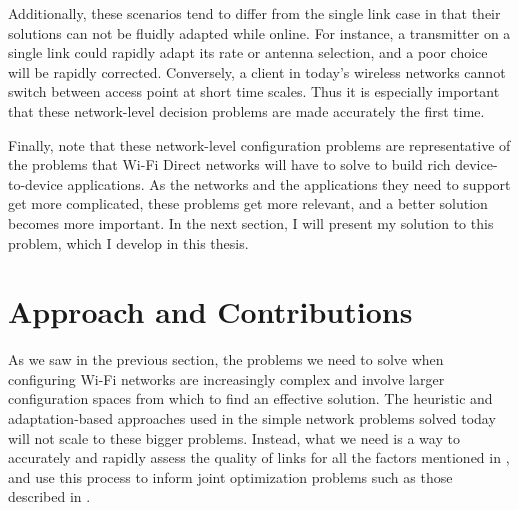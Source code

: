 Additionally, these scenarios tend to differ from the single link case in that their solutions can not be fluidly adapted while online. For instance, a transmitter on a single link could rapidly adapt its rate or antenna selection, and a poor choice will be rapidly corrected. Conversely, a client in today's wireless networks cannot switch between access point at short time scales. Thus it is especially important that these network-level decision problems are made accurately the first time.

Finally, note that these network-level configuration problems are representative of the problems that Wi-Fi Direct networks will have to solve to build rich device-to-device applications. As the networks and the applications they need to support get more complicated, these problems get more relevant, and a better solution becomes more important. In the next section, I will present my solution to this problem, which I develop in this thesis.

\section{Approach and Contributions}
\label{sec:intro_approach}
As we saw in the previous section, the problems we need to solve when configuring Wi-Fi networks are increasingly complex and involve larger configuration spaces from which to find an effective solution. The heuristic and adaptation-based approaches used in the simple network problems solved today will not scale to these bigger problems. Instead, what we need is a way to accurately and rapidly assess the quality of links for all the factors mentioned in , and use this process to inform joint optimization problems such as those described in .

